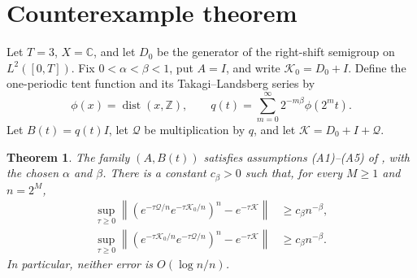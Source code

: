 \documentclass[11pt]{article}
\newtheorem{theorem}{Theorem}
\newcommand{\C}{\mathbb C}
\newcommand{\Z}{\mathbb Z}
\newcommand{\K}{\mathcal K}
\newcommand{\Kz}{\mathcal K_0}
\newcommand{\Q}{\mathcal Q}
\newcommand{\dist}{\operatorname{dist}}
\begin{document}
\section{Counterexample theorem}

Let $T=3$, $X=\C$, and let $D_0$ be the generator of the right-shift semigroup
on $L^2([0,T])$.  Fix $0<\alpha<\beta<1$, put $A=I$, and write
$\Kz=D_0+I$.  Define the one-periodic tent function and its
Takagi--Landsberg series by
\[
 \phi(x)=\dist(x,\Z),\qquad
 q(t)=\sum_{m=0}^{\infty}2^{-m\beta}\phi(2^m t).
\]
Let $B(t)=q(t)I$, let $\Q$ be multiplication by $q$, and let
$\K=D_0+I+\Q$.

\begin{theorem}\label{thm:main}
The family $(A,B(t))$ satisfies assumptions (A1)--(A5) of
\cite[Assumption~3.3]{NSZsurvey}, with the chosen $\alpha$ and $\beta$.
There is a constant $c_\beta>0$ such that, for every $M\ge1$ and
$n=2^M$,
\begin{align*}
 \sup_{\tau\ge0}\left\|
   (e^{-\tau\Q/n}e^{-\tau\Kz/n})^n-e^{-\tau\K}
 \right\| &\ge c_\beta n^{-\beta},\\
 \sup_{\tau\ge0}\left\|
   (e^{-\tau\Kz/n}e^{-\tau\Q/n})^n-e^{-\tau\K}
 \right\| &\ge c_\beta n^{-\beta}.
\end{align*}
In particular, neither error is $O(\log n/n)$.
\end{theorem}
\end{document}
